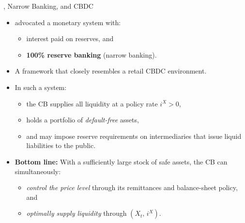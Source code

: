\documentclass[11pt,aspectratio=169]{beamer}
\begin{document}
\begin{frame}{\textcite{friedman1960program}, Narrow Banking, and CBDC}
\small
\begin{itemize}
\item \textcite{friedman1960program} advocated a monetary system with:
\begin{itemize}
    \item interest paid on reserves, and
    \item \textbf{100\% reserve banking} (narrow banking).
\end{itemize}
\item A framework that closely resembles a retail CBDC environment.

\vspace{0.6em}
\item In such a system:
\begin{itemize}
    \item the CB supplies all liquidity at a policy rate $i^X > 0$,
    \item holds a portfolio of \emph{default-free} assets,
    \item and may impose reserve requirements on intermediaries that issue liquid liabilities to the public.
\end{itemize}

\vspace{0.8em}

\item \textbf{Bottom line:}  
With a sufficiently large stock of safe assets, the CB can simultaneously:
\begin{itemize} \vspace{-0.3cm}
    \item \emph{control the price level} through its remittances and balance-sheet policy, and
    \item \emph{optimally supply liquidity} through $(X_t,\, i^X)$.
\end{itemize}
\end{itemize}
\end{frame}
\end{document}
